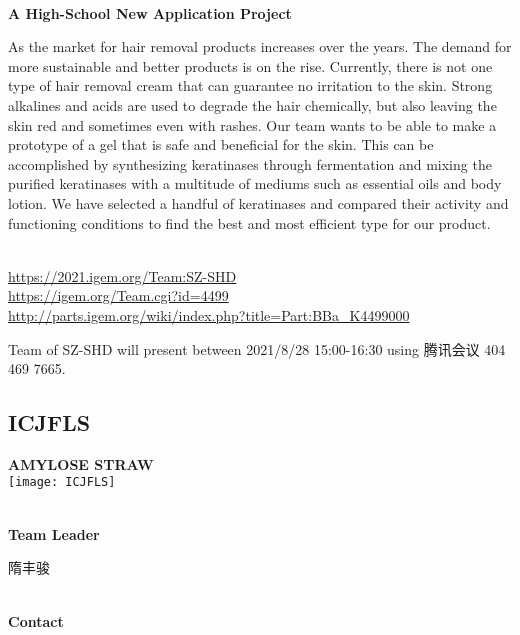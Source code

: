 \textbf{\\A High-School New Application Project\\}\begin{spacing}{1.5}

As the market for hair removal products increases over the years. The demand for more sustainable and better products is on the rise. Currently, there is not one type of hair removal cream that can guarantee no irritation to the skin. Strong alkalines and acids are used to degrade the hair chemically, but also leaving the skin red and sometimes even with rashes. Our team wants to be able to make a prototype of a gel that is safe and beneficial for the skin. This can be accomplished by synthesizing keratinases through fermentation and mixing the purified keratinases with a multitude of mediums such as essential oils and body lotion. We have selected a handful of keratinases and compared their activity and functioning conditions to find the best and most efficient type for our product.\end{spacing}
\\

\url{https://2021.igem.org/Team:SZ-SHD }\\
\url{https://igem.org/Team.cgi?id=4499 }\\
\url{http://parts.igem.org/wiki/index.php?title=Part:BBa_K4499000 }\\


\vfill{}









Team of SZ-SHD will present between       2021/8/28 15:00-16:30  using 腾讯会议 404 469 7665.
\newpage


\subsection{\textcolor{Blu}{ ICJFLS } }
\vspace{5mm}
\begin{center}
\large{
  \textbf{ AMYLOSE STRAW }\\

  \texttt{[image: ICJFLS]}
}
\end{center}
\textbf{\\Team Leader}

  隋丰骏


\textbf{\\Contact}

